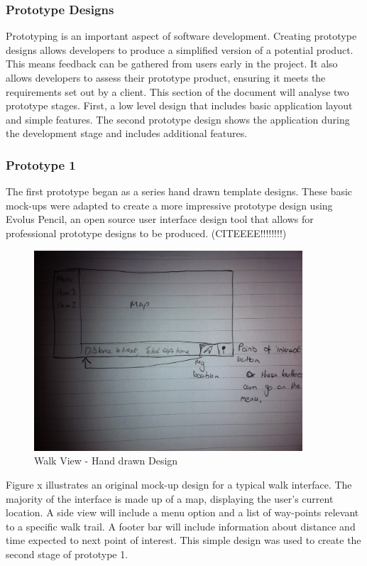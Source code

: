 \documentclass[11pt,a4paper]{article}
\begin{document}
\subsubsection{Prototype Designs}

Prototyping is an important aspect of software development. Creating prototype designs allows developers to produce a simplified version of a potential product. This means feedback can be gathered from users early in the project. It also allows developers to assess their prototype product, ensuring it meets the requirements set out by a client. This section of the document will analyse two prototype stages. First, a low level design that includes basic application layout and simple features. The second prototype design shows the application during the development stage and includes additional features.

\subsubsection{Prototype 1}

The first prototype began as a series hand drawn template designs. These basic mock-ups were adapted to create a more impressive prototype design using Evolus Pencil, an open source user interface design tool that allows for professional prototype designs to be produced. (CITEEEE!!!!!!!!)\\

\begin{figure}[H]
\begin{center}
\includegraphics[width=10cm]{./img/hand_drawn.jpg}
\caption{Walk View - Hand drawn Design} 
\end{center}
\end{figure}

Figure x illustrates an original mock-up design for a typical walk interface. The majority of the interface is made up of a map, displaying the user's current location. A side view will include a menu option and a list of way-points relevant to a specific walk trail. A footer bar will include information about distance and time expected to next point of interest. This simple design was used to create the second stage of prototype 1.\\
\end{document}
